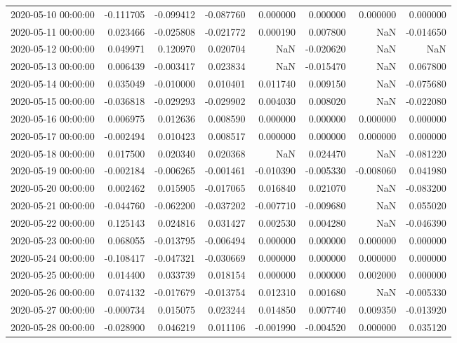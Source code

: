 \begin{tabular}{lrrrrrrr}
2020-05-10 00:00:00 & -0.111705 & -0.099412 & -0.087760 & 0.000000 & 0.000000 & 0.000000 & 0.000000 \\
2020-05-11 00:00:00 & 0.023466 & -0.025808 & -0.021772 & 0.000190 & 0.007800 & NaN & -0.014650 \\
2020-05-12 00:00:00 & 0.049971 & 0.120970 & 0.020704 & NaN & -0.020620 & NaN & NaN \\
2020-05-13 00:00:00 & 0.006439 & -0.003417 & 0.023834 & NaN & -0.015470 & NaN & 0.067800 \\
2020-05-14 00:00:00 & 0.035049 & -0.010000 & 0.010401 & 0.011740 & 0.009150 & NaN & -0.075680 \\
2020-05-15 00:00:00 & -0.036818 & -0.029293 & -0.029902 & 0.004030 & 0.008020 & NaN & -0.022080 \\
2020-05-16 00:00:00 & 0.006975 & 0.012636 & 0.008590 & 0.000000 & 0.000000 & 0.000000 & 0.000000 \\
2020-05-17 00:00:00 & -0.002494 & 0.010423 & 0.008517 & 0.000000 & 0.000000 & 0.000000 & 0.000000 \\
2020-05-18 00:00:00 & 0.017500 & 0.020340 & 0.020368 & NaN & 0.024470 & NaN & -0.081220 \\
2020-05-19 00:00:00 & -0.002184 & -0.006265 & -0.001461 & -0.010390 & -0.005330 & -0.008060 & 0.041980 \\
2020-05-20 00:00:00 & 0.002462 & 0.015905 & -0.017065 & 0.016840 & 0.021070 & NaN & -0.083200 \\
2020-05-21 00:00:00 & -0.044760 & -0.062200 & -0.037202 & -0.007710 & -0.009680 & NaN & 0.055020 \\
2020-05-22 00:00:00 & 0.125143 & 0.024816 & 0.031427 & 0.002530 & 0.004280 & NaN & -0.046390 \\
2020-05-23 00:00:00 & 0.068055 & -0.013795 & -0.006494 & 0.000000 & 0.000000 & 0.000000 & 0.000000 \\
2020-05-24 00:00:00 & -0.108417 & -0.047321 & -0.030669 & 0.000000 & 0.000000 & 0.000000 & 0.000000 \\
2020-05-25 00:00:00 & 0.014400 & 0.033739 & 0.018154 & 0.000000 & 0.000000 & 0.002000 & 0.000000 \\
2020-05-26 00:00:00 & 0.074132 & -0.017679 & -0.013754 & 0.012310 & 0.001680 & NaN & -0.005330 \\
2020-05-27 00:00:00 & -0.000734 & 0.015075 & 0.023244 & 0.014850 & 0.007740 & 0.009350 & -0.013920 \\
2020-05-28 00:00:00 & -0.028900 & 0.046219 & 0.011106 & -0.001990 & -0.004520 & 0.000000 & 0.035120 \\

\end{tabular}
